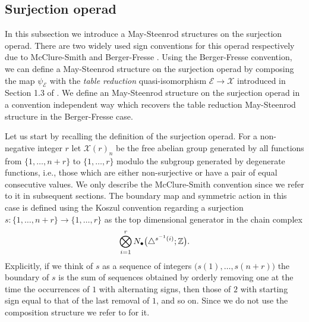 \subsection{Surjection operad}

In this subsection we introduce a May-Steenrod structures on the surjection operad. There are two widely used sign conventions for this operad respectively due to McClure-Smith \cite{mcclure03cochain} and Berger-Fresse \cite{berger04combinatorial}. Using the Berger-Fresse convention, we can define a May-Steenrod structure on the surjection operad by composing the map $\psi_{\mathcal E}$ with the \textit{table reduction} quasi-isomorphism $\mathcal E \to \mathcal X$ introduced in Section 1.3 of \cite{berger04combinatorial}. We define an May-Steenrod structure on the surjection operad in a convention independent way which recovers the table reduction May-Steenrod structure in the Berger-Fresse case.

Let us start by recalling the definition of the surjection operad. For a non-negative integer $r$ let $\mathcal X(r)_n$ be the free abelian group generated by all functions from $\{1, \dots, n+r\}$ to $\{1, \dots, r\}$ modulo the subgroup generated by degenerate functions, i.e., those which are either non-surjective or have a pair of equal consecutive values. We only describe the McClure-Smith convention since we refer to it in subsequent sections. The boundary map and symmetric action in this case is defined using the Koszul convention regarding a surjection $s : \{1, \dots, n+r\} \to \{1, \dots, r\} $ as the top dimensional generator in the chain complex
\begin{equation} \label{eq: surjection boundary}
\bigotimes_{i = 1}^r N_\bullet \big( \triangle^{s^{-1}(i)}; \mathbb{Z} \big).
\end{equation}
Explicitly, if we think of $s$ as a sequence of integers $\big( s(1), \dots, s(n+r) \big)$ the boundary of $s$ is the sum of sequences obtained by orderly removing one at the time the occurrences of $1$ with alternating signs, then those of $2$ with starting sign equal to that of the last removal of $1$, and so on. Since we do not use the composition structure we refer to \cite{mcclure03cochain} for it.

